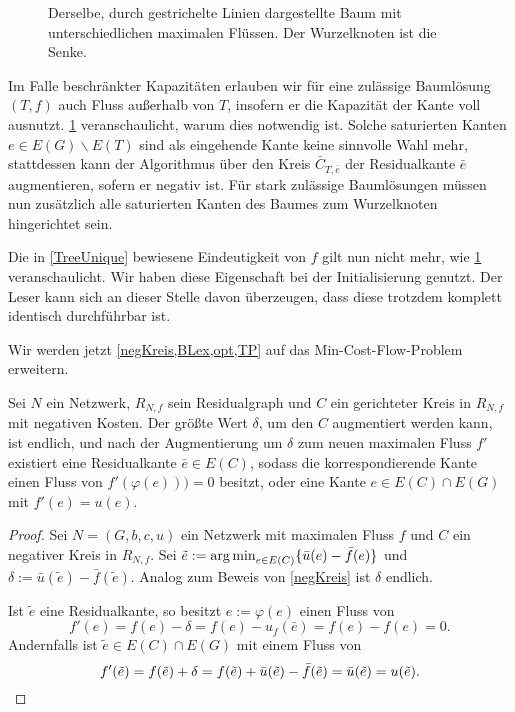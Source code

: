 \begin{figure}[!ht]\centering
		
	\caption{Derselbe, durch gestrichelte Linien dargestellte Baum mit unterschiedlichen maximalen Flüssen. Der Wurzelknoten ist die Senke.}
	\label{fig:NSA}
\end{figure}

Im Falle beschränkter Kapazitäten erlauben wir für eine zulässige Baumlösung $(T,f)$ auch Fluss außerhalb von $T$, insofern er die Kapazität der Kante voll ausnutzt. \cref{fig:NSA} veranschaulicht, warum dies notwendig ist. Solche saturierten Kanten $e\in E(G)\backslash E(T)$ sind als eingehende Kante keine sinnvolle Wahl mehr, stattdessen kann der Algorithmus über den Kreis $\bar{C}_{T,\bar{e}}$ der Residualkante $\bar{e}$ augmentieren, sofern er negativ ist. Für stark zulässige Baumlösungen müssen nun zusätzlich alle saturierten Kanten des Baumes zum Wurzelknoten hingerichtet sein.

Die in \cref{TreeUnique} bewiesene Eindeutigkeit von $f$ gilt nun nicht mehr, wie \cref{fig:NSA} veranschaulicht. Wir haben diese Eigenschaft bei der Initialisierung genutzt. Der Leser kann sich an dieser Stelle davon überzeugen, dass diese trotzdem komplett identisch durchführbar ist.

Wir werden jetzt \cref{negKreis,BLex,opt,TP} auf das Min-Cost-Flow-Problem erweitern.

\begin{lem}\label{negKreis2}Sei $N$ ein Netzwerk, $R_{N,f}$ sein Residualgraph und $C$ ein gerichteter Kreis in $R_{N,f}$ mit negativen Kosten. Der größte Wert $\delta$, um den $C$ augmentiert werden kann, ist endlich, und nach der Augmentierung um $\delta$ zum neuen maximalen Fluss $f'$ existiert eine Residualkante $\bar{e}\in E(C)$, sodass die korrespondierende Kante einen Fluss von $f'(\varphi(e)))=0$ besitzt, oder eine Kante $e\in E(C)\cap E(G)$ mit $f'(e)=u(e)$.\end{lem}
\begin{proof}Sei $N=(G,b,c,u)$ ein Netzwerk mit maximalen Fluss $f$ und $C$ ein negativer Kreis in $R_{N,f}$. Sei $\tilde{e}:=\operatorname*{arg\,min}_{e\in E(C)}\{\bar{u}(e)-\bar{f}(e)\}$ und $\delta:=\bar{u}(\tilde{e})-\bar{f}(\tilde{e})$. Analog zum Beweis von \cref{negKreis} ist $\delta$ endlich.
	
Ist $\tilde{e}$ eine Residualkante, so besitzt $e:=\varphi(e)$ einen Fluss von
\begin{equation*}
f'(e)=f(e)-\delta=f(e)-u_f(\bar{e})=f(e)-f(e)=0.\end{equation*} Andernfalls ist $\tilde{e}\in E(C)\cap E(G)$ mit einem Fluss von
\begin{equation*}
f'(\tilde{e})=f(\tilde{e})+\delta=f(\tilde{e})+\bar{u}(\tilde{e})-\bar{f}(\tilde{e})=\bar{u}(\tilde{e})=u(\tilde{e}).\qedhere\end{equation*}\end{proof}


